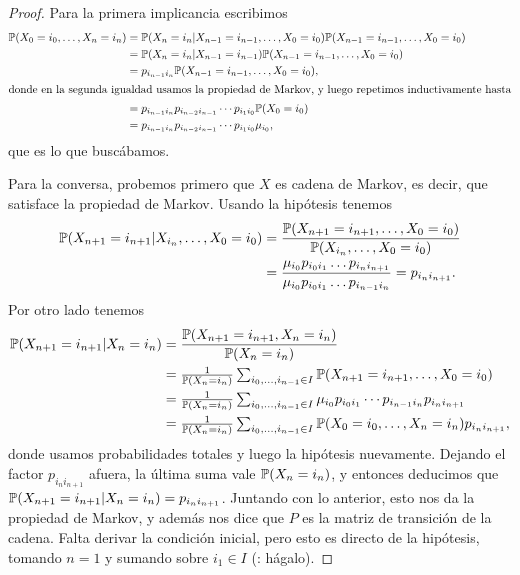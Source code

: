 \begin{proof}
Para la primera implicancia escribimos
\begin{align}
\pp(X_0=i_0,\dotsc,X_n=i_n)&=\pp(X_n=i_n|X_{n-1}=i_{n-1},\dotsc,X_0=i_0)\pp(X_{n-1}=i_{n-1},\dotsc,X_0=i_0)\hspace{-16pt}\\
&=\pp(X_n=i_n|X_{n-1}=i_{n-1})\pp(X_{n-1}=i_{n-1},\dotsc,X_0=i_0)\\
&=p_{i_{n-1}i_n}\pp(X_{n-1}=i_{n-1},\dotsc,X_0=i_0),\\
\shortintertext{donde en la segunda igualdad usamos la propiedad de Markov, y luego repetimos inductivamente hasta}
&=p_{i_{n-1}i_n}p_{i_{n-2}i_{n-1}}\dotsm p_{i_1i_0}\pp(X_0=i_0)\\
&=p_{i_{n-1}i_n}p_{i_{n-2}i_{n-1}}\dotsm p_{i_1i_0}\mu_{i_0},
\end{align}
que es lo que buscábamos.

Para la conversa, probemos primero que $X$ es cadena de Markov, es decir, que satisface la propiedad de Markov.
Usando la hipótesis tenemos
\begin{align}
\mathbb{P}(X_{n+1}=i_{n+1}|X_{i_n},\dotsc,X_0=i_0)&=\frac{\mathbb{P}(X_{n+1}=i_{n+1},\dotsc,X_0=i_0)}{\mathbb{P}(X_{i_n},\dotsc,X_0=i_0)}\\
&=\frac{\mu_{i_0}p_{i_0i_1}\dotsc p_{i_{n}i_{n+1}}}{\mu_{i_0}p_{i_0i_1}\dotsc p_{i_{n-1}i_n}}=p_{i_{n}i_{n+1}}.
\end{align}
Por otro lado tenemos
\begin{align}
\mathbb{P}(X_{n+1}=i_{n+1}|X_n=i_n)&=\frac{\mathbb{P}(X_{n+1}=i_{n+1},X_n=i_n)}{\mathbb{P}(X_n=i_n)}\\
&\textstyle=\frac1{\mathbb{P}(X_n=i_n)}\sum_{i_0,\dotsc,i_{n-1}\in I}\mathbb{P}(X_{n+1}=i_{n+1},\dotsc,X_0=i_0)\\
&\textstyle=\frac1{\mathbb{P}(X_n=i_n)}\sum_{i_0,\dotsc,i_{n-1}\in I}\mu_{i_0}p_{i_0i_1}\dotsm p_{i_{n-1}i_{n}}p_{i_{n}i_{n+1}}\\&
\textstyle=\frac1{\mathbb{P}(X_n=i_n)}\sum_{i_0,\dotsc,i_{n-1}\in I}\mathbb{P}(X_0=i_0,\dotsc,X_{n}=i_{n})p_{i_{n}i_{n+1}},
\end{align}
donde usamos probabilidades totales y luego la hipótesis nuevamente.
Dejando el factor $p_{i_{n}i_{n+1}}$ afuera, la última suma vale $\mathbb{P}(X_n=i_n)$, y entonces deducimos que $\mathbb{P}(X_{n+1}=i_{n+1}|X_n=i_n)=p_{i_{n}i_{n+1}}$.
Juntando con lo anterior, esto nos da la propiedad de Markov, y además nos dice que $P$ es la matriz de transición de la cadena.
Falta derivar la condición inicial, pero esto es directo de la hipótesis, tomando $n=1$ y sumando sobre $i_1\in I$ (\uexers: hágalo).
\end{proof}

